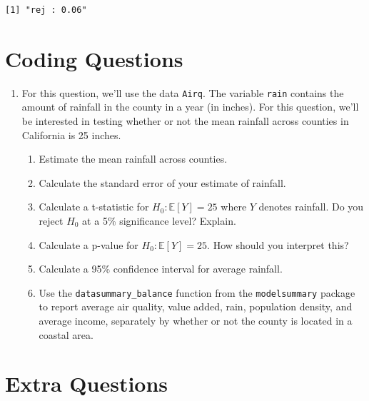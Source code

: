 \documentclass[
  letterpaper,
  DIV=11,
  numbers=noendperiod]{scrreprt}
\begin{document}
\begin{verbatim}
[1] "rej : 0.06"
\end{verbatim}

\section{Coding Questions}\label{coding-questions-1}

\begin{enumerate}
\def\labelenumi{\arabic{enumi}.}
\item
  For this question, we'll use the data \texttt{Airq}. The variable
  \texttt{rain} contains the amount of rainfall in the county in a year
  (in inches). For this question, we'll be interested in testing whether
  or not the mean rainfall across counties in California is 25 inches.

  \begin{enumerate}
  \def\labelenumii{\alph{enumii})}
  \item
    Estimate the mean rainfall across counties.
  \item
    Calculate the standard error of your estimate of rainfall.
  \item
    Calculate a t-statistic for \(H_0 : \mathbb{E}[Y] = 25\) where \(Y\)
    denotes rainfall. Do you reject \(H_0\) at a 5\% significance level?
    Explain.
  \item
    Calculate a p-value for \(H_0: \mathbb{E}[Y] = 25\). How should you
    interpret this?
  \item
    Calculate a 95\% confidence interval for average rainfall.
  \item
    Use the \texttt{datasummary\_balance} function from the
    \texttt{modelsummary} package to report average air quality, value
    added, rain, population density, and average income, separately by
    whether or not the county is located in a coastal area.
  \end{enumerate}
\end{enumerate}

\section{Extra Questions}\label{extra-questions-1}
\end{document}
